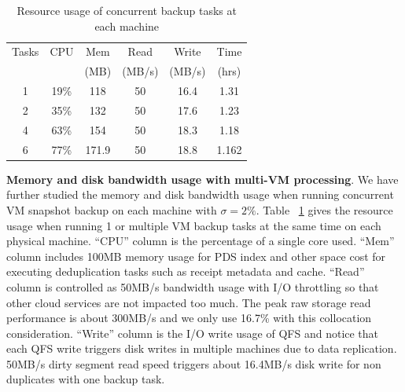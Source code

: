 \begin{table}
    \begin{tabular}{|c|c|c|c|c|c|}
    \hline
    Tasks & CPU & Mem &Read &  Write  & Time  \\ 
    & & (MB)          &(MB/s) &  (MB/s) & (hrs) \\ \hline
    1     & 19\% & 118 & 50 & 16.4 & 1.31\\ \hline
    2     & 35\% & 132 &50  & 17.6 & 1.23\\ \hline
    4     & 63\% & 154&50   & 18.3 & 1.18\\ \hline
    6     & 77\% & 171.9 & 50 &  18.8 & 1.162\\ \hline
    \end{tabular}
\caption{Resource usage of concurrent backup tasks at each machine}
\label{tab:resource_usage}
\end{table}

{\bf Memory and disk bandwidth usage with multi-VM processing}. 
We have further studied the memory and disk bandwidth usage 
when running concurrent VM snapshot backup on each machine with $\sigma=2\%$. 
Table ~\ref{tab:resource_usage} gives the resource usage  when
running 1 or multiple  VM backup tasks at the same time on each physical machine. 
``CPU'' column is the percentage of a single core used. 
``Mem'' column includes 100MB memory usage for PDS index and other space cost for executing deduplication tasks such as 
receipt metadata and cache. 
``Read'' column is controlled as 50MB/s bandwidth usage with I/O throttling so that other cloud services are not impacted too much.
The peak raw storage read performance is about 300MB/s and we only use 16.7\% with this collocation consideration.
``Write'' column is the I/O write usage of QFS and notice that each QFS write triggers disk writes in multiple machines due to
data replication.     50MB/s dirty segment read speed triggers about 16.4MB/s disk write for non duplicates with one backup task.

